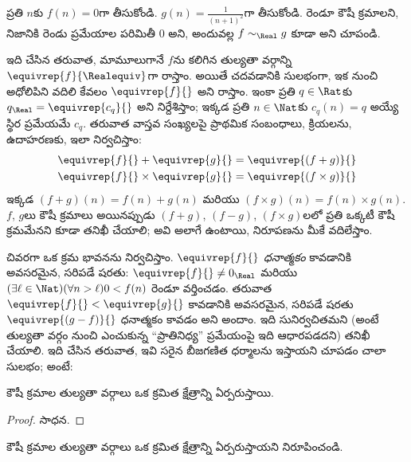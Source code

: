 \documentclass[../../../include/open-logic-section]{subfiles}
\begin{document}
\begin{prob}
ప్రతి $n$కు $f(n) = 0$గా తీసుకోండి. $g(n) = \frac{1}{(n+1)^2}$గా
తీసుకోండి. రెండూ కౌషీ క్రమాలని, నిజానికి రెండు ప్రమేయాల పరిమితీ
$0$ అని, అందువల్ల $f \sim_\Real g$ కూడా అని చూపండి.
\end{prob}

ఇది చేసిన తరువాత, మామూలుగానే $f$ను  కలిగిన తుల్యతా
వర్గాన్ని $\equivrep{f}{\Realequiv}$గా రాస్తాం. అయితే చదవడానికి
సులభంగా, ఇక నుంచి అధోలిపిని వదిలి కేవలం
$\equivrep{f}{}$ అని రాస్తాం. ఇంకా ప్రతి $q \in \Rat$కు
$q_{\Real} = \equivrep{c_{q}}{}$ అని నిర్దేశిస్తాం; ఇక్కడ ప్రతి
$n \in \Nat$కు $c_q(n) = q$ అయ్యే స్థిర ప్రమేయమే $c_{q}$. తరువాత
వాస్తవ సంఖ్యలపై ప్రాథమిక సంబంధాలు, క్రియలను, ఉదాహరణకు, ఇలా
నిర్వచిస్తాం:
\begin{align*}
	\equivrep{f}{} + \equivrep{g}{} &= 	\equivrep{(f + g)}{} \\
	\equivrep{f}{} \times 	\equivrep{g}{} &= \equivrep{(f \times g)}{}
\end{align*}
ఇక్కడ $(f + g)(n) = f(n) + g(n)$ మరియు
$(f \times g)(n) = f(n) \times g(n)$. $f$, $g$లు కౌషీ క్రమాలు
అయినప్పుడు $(f + g)$, $(f-g)$, $(f\times g)$లలో ప్రతి ఒక్కటీ కౌషీ
క్రమమేనని కూడా తనిఖీ చేయాలి; అవి అలాగే ఉంటాయి, నిరూపణను మీకే
వదిలేస్తాం.

చివరగా ఒక క్రమ భావనను నిర్వచిస్తాం. $\equivrep{f}{}$ \emph{ధనాత్మకం}
కావడానికి అవసరమైన, సరిపడే షరతు: $\equivrep{f}{}\neq 0_\Real$
మరియు $(\exists \ell \in \Nat)(\forall n > \ell)0 < f(n)$ రెండూ
వర్తించడం. తరువాత $\equivrep{f}{} < \equivrep{g}{}$ కావడానికి అవసరమైన,
సరిపడే షరతు $\equivrep{(g - f)}{}$ ధనాత్మకం కావడం అని అందాం. ఇది సునిర్వచితమని
(అంటే తుల్యతా వర్గం నుంచి ఎంచుకున్న ``ప్రాతినిధ్య'' ప్రమేయంపై ఇది
ఆధారపడదని) తనిఖీ చేయాలి.
ఇది చేసిన తరువాత, ఇవి సరైన బీజగణిత ధర్మాలను ఇస్తాయని చూపడం చాలా
సులభం; అంటే:
\begin{thm}
కౌషీ క్రమాల తుల్యతా వర్గాలు ఒక క్రమిత క్షేత్రాన్ని ఏర్పరుస్తాయి.
\end{thm}

\begin{proof}
సాధన.
\end{proof}

\begin{prob}
కౌషీ క్రమాల తుల్యతా వర్గాలు ఒక క్రమిత క్షేత్రాన్ని ఏర్పరుస్తాయని
నిరూపించండి.
\end{prob}
\end{document}
